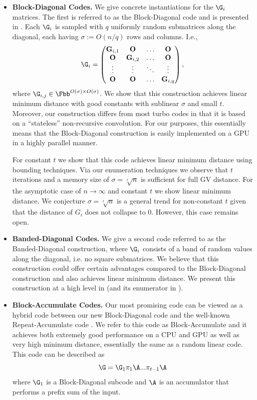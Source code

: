 \begin{itemize}
    \item \textbf{Block-Diagonal Codes.} We give concrete instantiations for the $\G_i$ matrices. The first is referred to as the Block-Diagonal code and is presented in . Each $\G_i$ is sampled with $q$ uniformly random submatrices along the diagonal, each having  $\sigma:=O(n/q)$ rows and columns. I.e.,
    $$
        \G_i = \left(\begin{matrix}\mathbf{G}_{i,1} & \mathbf{O} &\ldots&\mathbf{O}\\\mathbf{O} &\mathbf{G}_{i,2} & \ldots&\mathbf{O}\\\vdots & \vdots &\ddots&\vdots\\\mathbf{O} & \mathbf{O} &\ldots&\mathbf{G}_{i,q}\end{matrix}\right),
    $$
    where $\G_{i,j}\in\Fbb^{O(\sigma)\times O(\sigma)}$. We show that this construction achieves linear minimum distance with good constants with sublinear $\sigma$ and small $t$. Moreover, our construction differs from most turbo codes in that it is based on a ``stateless'' non-recursive convolution. For our purposes, this essentially means that the Block-Diagonal construction is easily implemented on a GPU in a highly parallel manner.

    For constant $t$ we show that this code achieves linear minimum distance using bounding techniques. Via our enumeration techniques we observe that $t$ iterations and a memory size of $\sigma=\sqrt[t]{n}$ is sufficient for full GV distance. For the asymptotic case of $n\rightarrow \infty$ and constant $t$ we show linear minimum distance. We conjecture  $\sigma=\sqrt[t]{n}$ is a general trend for non-constant $t$ given that the distance of $G_i$ does not collapse to 0. However, this case remains open.
    
    \item \textbf{Banded-Diagonal Codes.} We give a second code referred to as the Banded-Diagonal construction, where $\G_i$ consists of a band of random values along the diagonal, i.e. no square submatrices. We believe that this construction could offer certain advantages compared to the Block-Diagonal construction and also achieves linear minimum distance. We present this construction at a high level in  (and its enumerator in ).

    \item \textbf{Block-Accumulate Codes.} Our most promising code can be viewed as a hybrid code between our new Block-Diagonal code and the well-known Repeat-Accumulate code \cite{turbo}. We refer to this code as Block-Accumulate and it achieves both extremely good performance on a CPU and GPU as well as very high minimum distance, essentially the same as a random linear code. This code can be described as
    $$
        \G =\G_1 \pi_1 \A  ...\pi_{t-1} \A
    $$
    where $\G_1$ is a Block-Diagonal subcode and $\A$ is an accumulator that performs a prefix sum of the input.


\end{itemize}

